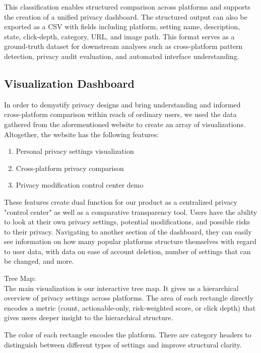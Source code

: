 \documentclass[12pt,letterpaper]{article}
\begin{document}
    This classification enables structured comparison across platforms and supports the creation of a unified privacy dashboard. The structured output can also be exported as a CSV with fields including platform, setting name, description, state, click-depth, category, URL, and image path. This format serves as a ground-truth dataset for downstream analyses such as cross-platform pattern detection, privacy audit evaluation, and automated interface understanding.

    \subsection{Visualization Dashboard}
    
    In order to demystify privacy designs and bring understanding and informed cross-platform comparison within reach of ordinary users, we used the data gathered from the aforementioned website to create an array of visualizations. Altogether, the website has the following features:
    
    \begin{enumerate}
        \item Personal privacy settings visualization
        \item Cross-platform privacy comparison
        \item Privacy modification control center demo
    \end{enumerate}
    
    These features create dual function for our product as a centralized privacy "control center" as well as a comparative transparency tool. Users have the ability to look at their own privacy settings, potential modifications, and possible risks to their privacy. Navigating to another section of the dashboard, they can easily see information on how many popular platforms structure themselves with regard to user data, with data on ease of account deletion, number of settings that can be changed, and more.

    Tree Map:\\
    The main visualization is our interactive tree map. It gives us a 
    hierarchical overview of privacy settings across platforms. The area of each rectangle directly encodes a metric (count, actionable-only, risk-weighted score, or click depth) that gives users deeper insight to the hierarchical structure. 

    The color of each rectangle encodes the platform. There are category headers to distinguish between different types of settings and improve structural clarity. 
\end{document}

